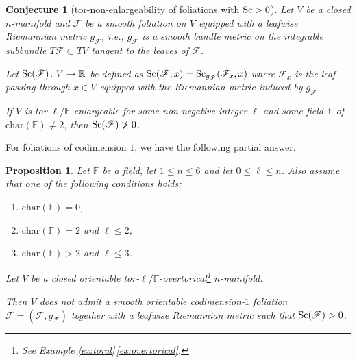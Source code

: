 \documentclass[10pt,a4paper]{amsart}
\numberwithin{equation}{section}
\newtheorem{Proposition}[Theorem]{Proposition}
\newtheorem{Conjecture}[Theorem]{Conjecture}
 { \theoremstyle{definition}
\newtheorem{Definition}[Theorem]{Definition}
\newtheorem{Note}[Theorem]{Note}
\newtheorem{Example}[Theorem]{Example}
\newtheorem{Remark}[Theorem]{Remark}
}
\newcommand{\F}{\mathbb{F}}
\newcommand{\R}{\mathbb{R}}
\newcommand{\charac}{\mathrm{char}}
\newcommand{\Sc}{{\rm Sc}}
\newcommand{\myicon}{$\,\,\,\triangleright$}
\begin{document}
\begin{Conjecture}[tor-non-enlargeability of foliations with $\Sc>0$] \label{foliations}
 Let $V$ be a closed $n$-manifold and $\mathscr F$ be a smooth foliation on $V$ equipped with a leafwise Riemannian metric $g_{\mathscr F}$, i.e., $g_{\mathscr F}$ is a smooth bundle metric on the integrable subbundle $T \mathscr F \subset TV$ tangent to the leaves of $\mathscr F$.

Let $\Sc(\mathscr F) \colon V \to \R$ be defined as $\Sc(\mathscr F, x) = \Sc_{g_{\mathscr F}}({\mathscr F}_x , x)$ where ${\mathscr F}_x$ is the leaf passing through $x \in V$ equipped with the Riemannian metric induced by $g_{\mathscr F}$.


If $V$ is tor-$\ell / \mathbb F$-enlargeable for some non-negative integer $\ell$ and some field $\F$ of $\charac(\F) \neq 2$, then $\Sc(\mathscr F) \ngtr 0$.
 \end{Conjecture}

For foliations of codimension $1$, we have the following partial answer.

\begin{Proposition} Let $\F$ be a field, let $1 \leq n \leq 6$ and let $0 \leq \ell \leq n$.
Also assume that one of the following conditions holds:
\begin{enumerate}[\myicon]\itemsep=0pt
 \item $\charac(\F) = 0$,
 \item $\charac(\F) = 2$ and $\ell \leq 2$,
 \item $\charac(\F) > 2$ and $\ell \leq 3$.
\end{enumerate}
Let $V$ be a closed orientable tor-$\ell/\F$-overtorical\footnote{See Example \ref{ex:toral}\,\ref{ex:overtorical}.} $n$-manifold.

Then $V$ does not admit a smooth orientable codimension-$1$ foliation $\mathscr F=(\mathscr F, g_{\mathscr F})$ together with a leafwise Riemannian metric such that $ \Sc (\mathscr F)>0$.
\end{Proposition}
\end{document}
